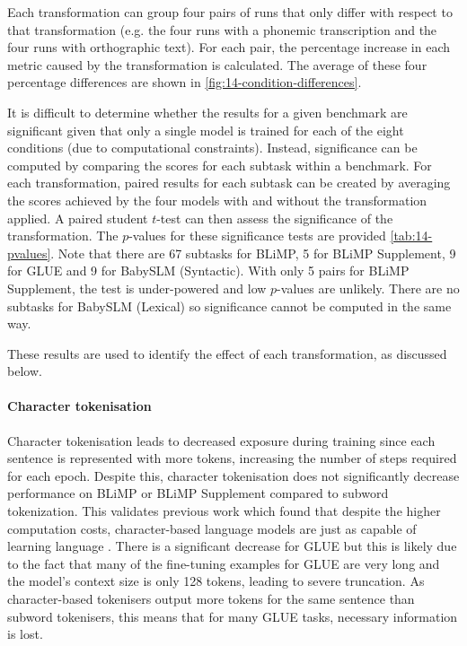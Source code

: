 Each transformation can group four pairs of runs that only differ with respect to that transformation (e.g. the four runs with a phonemic transcription and the four runs with orthographic text). For each pair, the percentage increase in each metric caused by the transformation is calculated. The average of these four percentage differences are shown in \cref{fig:14-condition-differences}.

It is difficult to determine whether the results for a given benchmark are significant given that only a single model is trained for each of the eight conditions (due to computational constraints). Instead, significance can be computed by comparing the  scores for each subtask within a benchmark. For each transformation, paired results for each subtask can be created by averaging the scores achieved by the four models with and without the transformation applied. A paired student $t$-test can then assess the significance of the transformation. The $p$-values for these significance tests are provided \cref{tab:14-pvalues}. Note that there are 67 subtasks for BLiMP, 5 for BLiMP Supplement, 9 for GLUE and 9 for BabySLM (Syntactic). With only 5 pairs for BLiMP Supplement, the test is under-powered and low $p$-values are unlikely. There are no subtasks for BabySLM (Lexical) so significance cannot be computed in the same way. 

These results are used to identify the effect of each transformation, as discussed below.

\paragraph{Character tokenisation} Character tokenisation leads to decreased exposure during training since each sentence is represented with more tokens, increasing the number of steps required for each epoch. Despite this, character tokenisation does not significantly decrease performance on BLiMP or BLiMP Supplement compared to subword tokenization. This validates previous work which found that despite the higher computation costs, character-based language models are just as capable of learning language \citep{al-rfou_character-level_2019, hahn-baroni-2019-tabula}. There is a significant decrease for GLUE but this is likely due to the fact that many of the fine-tuning examples for GLUE are very long and the model's context size is only 128 tokens, leading to severe truncation. As character-based tokenisers output more tokens for the same sentence than \bpe subword tokenisers, this means that for many GLUE tasks, necessary information is lost.

